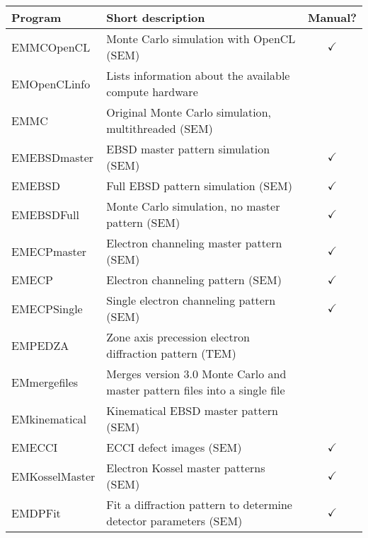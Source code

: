 \documentclass[DIV=calc, paper=letter, fontsize=11pt]{scrartcl}	 %
\begin{document}
\begin{table*}[h]
\centering\leavevmode
{\footnotesize
\begin{tabular}{|l|l|c|}
\hline
Program & Short description & Manual? \\
\hline\hline
  \textsf{EMMCOpenCL} & Monte Carlo simulation with OpenCL (SEM) & $\checkmark$\\
    {\color{blue}\textsf{EMOpenCLinfo}} & Lists information about the available compute hardware & \\
    {\color{blue}\textsf{EMMC}} & Original Monte Carlo simulation, multithreaded (SEM) & \\
  \textsf{EMEBSDmaster} & EBSD master pattern simulation (SEM) & $\checkmark$\\
  \textsf{EMEBSD} & Full EBSD pattern simulation (SEM) & $\checkmark$\\
    {\color{blue}\textsf{EMEBSDFull}} & Monte Carlo simulation, no master pattern (SEM) & $\checkmark$\\  
  \textsf{EMECPmaster} & Electron channeling master pattern (SEM) & $\checkmark$\\
  \textsf{EMECP} & Electron channeling pattern (SEM) & $\checkmark$\\
    {\color{blue}\textsf{EMECPSingle}} & Single electron channeling pattern (SEM) & $\checkmark$\\
    {\color{blue}\textsf{EMPEDZA}} & Zone axis precession electron diffraction pattern (TEM) & \\
    {\color{blue}\textsf{EMmergefiles}} & Merges version 3.0 Monte Carlo and master pattern files into a single file & \\  
    {\color{blue}\textsf{EMkinematical}} & Kinematical EBSD master pattern (SEM) & \\
    {\color{blue}\textsf{EMECCI}} & ECCI defect images (SEM) & $\checkmark$\\
  \textsf{EMKosselMaster} & Electron Kossel master patterns (SEM) & $\checkmark$ \\
    {\color{blue}\textsf{EMDPFit}} & Fit a diffraction pattern to determine detector parameters (SEM) & $\checkmark$\\

\end{tabular}}
\end{table*}
\end{document}
